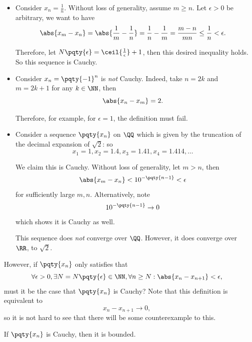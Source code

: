 \begin{examples}
    \label{ex:seq-cauchy}
    \begin{itemize}
        \item Consider \(x_n = \frac{1}{n}\). Without loss of generality, assume \(m \geq n\). Let \(\epsilon > 0\) be arbitrary, we want to have
        \[
            \abs{x_m - x_n} = \abs{\frac{1}{m} - \frac{1}{n}} = \frac{1}{n} - \frac{1}{m} = \frac{m - n}{mn} \leq \frac{1}{n} < \epsilon.
        \]

        Therefore, let \(N\pqty{\epsilon} = \ceil{\frac{1}{\epsilon}} + 1\), then this desired inequality holds. So this sequence is Cauchy.

        \item Consider \(x_n = \pqty{-1}^{n}\) is \emph{not} Cauchy. Indeed, take \(n = 2k\) and \(m = 2k + 1\) for any \(k \in \NN\), then
        \[
            \abs{x_n - x_m} = 2.
        \]

        Therefore, for example, for \(\epsilon = 1\), the definition must fail.

        \item Consider a sequence \(\pqty{x_n}\) on \(\QQ\) which is given by the truncation of the decimal expansion of \(\sqrt{2}\): so
        \[
            x_1 = 1, x_2 = 1.4, x_3 = 1.41, x_4 = 1.414, \ldots
        \]

        We claim this is Cauchy. Without loss of generality, let \(m > n\), then
        \[
            \abs{x_m - x_n} < 10^{-\pqty{n - 1}} < \epsilon
        \]
        for sufficiently large \(m, n\). Alternatively, note
        \[
            10^{-\pqty{n - 1}} \to 0
        \]
        which shows it is Cauchy as well.

        This sequence does \emph{not} converge over \(\QQ\). However, it does converge over \(\RR\), to \(\sqrt{2}\).
    \end{itemize}
\end{examples}

However, if \(\pqty{x_n}\) only satisfies that
\[
\forall \epsilon > 0, \exists N = N\pqty{\epsilon} \in \NN, \forall n \geq N: \abs{x_n - x_{n + 1}} < \epsilon,
\]
must it be the case that \(\pqty{x_n}\) is Cauchy? Note that this definition is equivalent to 
\[
    x_n - x_{n + 1} \to 0,
\]
so it is not hard to see that there will be some counterexample to this.

\begin{lemma}
    \label{lem:seq-cauchy-sequences-are-bounded}%
    If \(\pqty{x_n}\) is Cauchy, then it is bounded.
\end{lemma}

